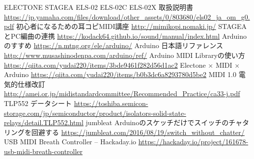 \documentclass[uplatex, 10pt, dvipdfmx]{jsarticle}
\numberwithin{equation}{section}
\begin{document}
\begin{thebibliography}{99}
 ELECTONE STAGEA ELS-02 ELS-02C ELS-02X 取扱説明書 \url{https://jp.yamaha.com/files/download/other_assets/0/803680/els02_ja_om_g0.pdf}
 初心者になるための耳コピMIDI講座 \url{http://mimikopi.nomaki.jp/}
 STAGEAとPC編曲の連携 \url{https://kodack64.github.io/sound/manual/index.html}
 Arduinoのすすめ \url{https://n.mtng.org/ele/arduino/}
 Arduino 日本語リファレンス \url{http://www.musashinodenpa.com/arduino/ref/}
 Arduino MIDI Libraryの使い方 \url{https://qiita.com/yudai220/items/3bde9461f282d56d1ac2}
 Electone $\times$ MIDI $\times$ Arduino \url{https://qiita.com/yudai220/items/b0b3dc6a8293780d5be2}
 MIDI 1.0 電気的仕様改訂 \url{http://amei.or.jp/midistandardcommittee/Recommended_Practice/ca33-j.pdf}
 TLP552 データシート \url{https://toshiba.semicon-storage.com/jp/semiconductor/product/isolators-solid-state-relays/detail.TLP552.html}
 jumbleat  Arduinoのスケッチだけでスイッチのチャタリングを回避する \url{https://jumbleat.com/2016/08/19/switch_without_chatter/}
 USB MIDI Breath Controller -- Hackaday.io \url{https://hackaday.io/project/161678-usb-midi-breath-controller}

\end{thebibliography}
\end{document}
